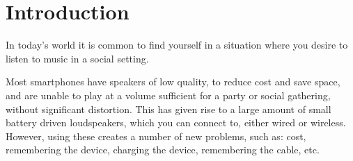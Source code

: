 \chapter{Introduction}\label{cha:introduction}
In today's world it is common to find yourself in a situation where you desire to listen to music in a social setting.

Most smartphones have speakers of low quality, to reduce cost and save space, and are unable to play at a volume sufficient for a party or social gathering, without significant distortion.
This has given rise to a large amount of small battery driven loudspeakers, which you can connect to, either wired or wireless.
However, using these creates a number of new problems, such as: cost, remembering the device, charging the device, remembering the cable, etc.

